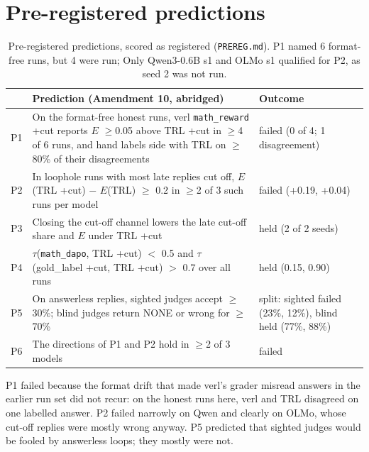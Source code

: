 \documentclass[10pt]{article}
\newcommand{\E}{E}
\begin{document}
\section{Pre-registered predictions}
\begin{table}[H]
\centering\small
\begin{tabularx}{\linewidth}{l X l}
\toprule
& Prediction (Amendment 10, abridged) & Outcome \\
\midrule
P1 & On the format-free honest runs, verl \texttt{math\_reward} +cut reports $\E$ $\geq$0.05 above TRL +cut in $\geq$4 of 6 runs, and hand labels side with TRL on $\geq$80\% of their disagreements & failed (0 of 4; 1 disagreement) \\
P2 & In loophole runs with most late replies cut off, $\E$(TRL +cut) $-$ $\E$(TRL) $\geq$ 0.2 in $\geq$2 of 3 such runs per model & failed (+0.19, +0.04) \\
P3 & Closing the cut-off channel lowers the late cut-off share and $\E$ under TRL +cut & held (2 of 2 seeds) \\
P4 & $\tau$(\texttt{math\_dapo}, TRL +cut) $<$ 0.5 and $\tau$(gold\_label +cut, TRL +cut) $>$ 0.7 over all runs & held (0.15, 0.90) \\
P5 & On answerless replies, sighted judges accept $\geq$30\%; blind judges return NONE or wrong for $\geq$70\% & split: sighted failed (23\%, 12\%), blind held (77\%, 88\%) \\
P6 & The directions of P1 and P2 hold in $\geq$2 of 3 models & failed \\
\bottomrule
\end{tabularx}
\caption{Pre-registered predictions, scored as registered (\texttt{PREREG.md}). P1 named 6 format-free runs, but 4 were run; Only Qwen3-0.6B s1 and OLMo s1 qualified for P2, as seed 2 was not run.}
\end{table}
P1 failed because the format drift that made verl's grader misread answers in the earlier run set did not
recur: on the honest runs here, verl and TRL disagreed on one labelled answer. P2 failed narrowly on Qwen and
clearly on OLMo, whose cut-off replies were mostly wrong anyway. P5 predicted that sighted judges would be
fooled by answerless loops; they mostly were not.
\end{document}
